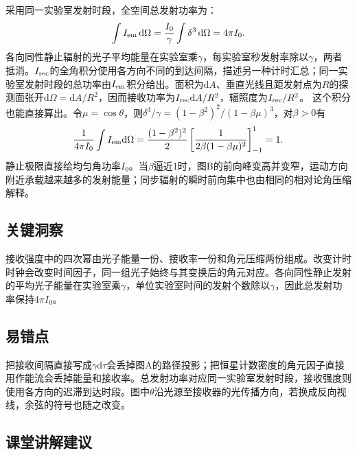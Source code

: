 \documentclass[UTF8,fontset=fandol,a4paper,11pt]{ctexart}
\newcommand{\dd}{\mathop{}\!\mathrm{d}}
\begin{document}
采用同一实验室发射时段，全空间总发射功率为：
\[
\int I_{\rm em}\dd\Omega
=\frac{I_0}{\gamma}\int\delta^3\dd\Omega
=4\pi I_0.
\]
各向同性静止辐射的光子平均能量在实验室乘$\gamma$，每实验室秒发射率除以$\gamma$，两者抵消。$I_{\rm rec}$的全角积分使用各方向不同的到达间隔，描述另一种计时汇总；同一实验室发射时段的总功率由$I_{\rm em}$积分给出。面积为$\mathrm dA$、垂直光线且距发射点为$R$的探测面张开$\mathrm d\Omega=\mathrm dA/R^2$，因而接收功率为$I_{\rm rec}\mathrm dA/R^2$，辐照度为$I_{\rm rec}/R^2$。
这个积分也能直接算出。令$\mu=\cos\theta$，则$\delta^3/\gamma=(1-\beta^2)^2/(1-\beta\mu)^3$，对$\beta>0$有
\[
\frac{1}{4\pi I_0}\int I_{\rm em}\mathrm d\Omega
=\frac{(1-\beta^2)^2}{2}\left[\frac{1}{2\beta(1-\beta\mu)^2}\right]_{-1}^{1}=1.
\]
静止极限直接给均匀角功率$I_0$。当$\beta$逼近1时，图B的前向峰变高并变窄，运动方向附近承载越来越多的发射能量；同步辐射的瞬时前向集中也由相同的相对论角压缩解释。





\subsection*{关键洞察}

接收强度中的四次幂由光子能量一份、接收率一份和角元压缩两份组成。改变计时时钟会改变时间因子，同一组光子始终与其变换后的角元对应。各向同性静止发射的平均光子能量在实验室乘$\gamma$，单位实验室时间的发射个数除以$\gamma$，因此总发射功率保持$4\pi I_0$。



\subsection*{易错点}

把接收间隔直接写成$\gamma\mathrm d\tau$会丢掉图A的路径投影；把恒星计数密度的角元因子直接用作能流会丢掉能量和接收率。总发射功率对应同一实验室发射时段，接收强度则使用各方向的迟滞到达时段。图中$\theta$沿光源至接收器的光传播方向，若换成反向视线，余弦的符号也随之改变。



\subsection*{课堂讲解建议}
\end{document}
